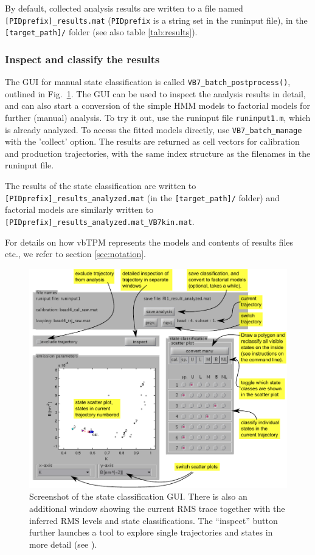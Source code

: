 By default, collected analysis results are written to a file named
\texttt{[PIDprefix]\_results.mat} (\texttt{PIDprefix} is a string set
in the runinput file), in the \texttt{[target\_path]/} folder (see
also table \ref{tab:results}).

\subsubsection*{Inspect and classify the results} 
The GUI for manual state classification is called
\verb+VB7_batch_postprocess()+, outlined in
Fig.~\ref{fig:postprocess}. The GUI can be used to inspect the
analysis results in detail, and can also start a conversion of the
simple HMM models to factorial models for further (manual)
analysis. To try it out, use the runinput file \verb+runinput1.m+,
which is already analyzed. To access the fitted models directly, use
\verb+VB7_batch_manage+ with the 'collect' option. The results are
returned as cell vectors for calibration and production trajectories,
with the same index structure as the filenames in the runinput file.

The results of the state classification are written to
\texttt{[PIDprefix]\_results\_analyzed.mat} (in the
\texttt{[target\_path]/} folder) and factorial models are similarly
written to \texttt{[PIDprefix]\_results\_analyzed.mat\_VB7kin.mat}.

For details on how vbTPM represents the models and contents of results
files etc., we refer to section \ref{sec:notation}.

\begin{figure}
  \begin{center}
    \includegraphics{figures/GUI_manual.pdf}    
  \end{center}
  \caption{Screenshot of the state classification GUI. There is also
    an additional window showing the current RMS trace together with
    the inferred RMS levels and state classifications. The ``inspect''
    button further launches a tool to explore single trajectories and
    states in more detail (see \Fig{}).}\label{fig:postprocess}
\end{figure}

